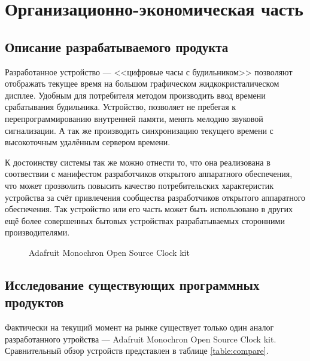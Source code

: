 \section{Организационно-экономическая часть}

\subsection{Описание разрабатываемого продукта}
\begin{par}
Разработанное устройство --- <<цифровые часы с будильником>> позволяют отображать
текущее время на большом графическом жидкокристалическом дисплее. Удобным для
потребителя методом производить ввод времени срабатывания будильника.
Устройство, позволяет не пребегая к перепрограммированию внутренней памяти, менять
мелодию звуковой сигнализации. А так же производить синхронизацию текущего времени
с высокоточным удалённым сервером времени.
\end{par}

\begin{par}
К достоинству системы так же можно отнести то, что она реализована в соотвествии с манифестом
разработчиков открытого аппаратного обеспечения, что может прозволить повысить качество потребительских
характеристик устройства за счёт привлечения сообщества разработчиков открытого аппаратного
обеспечения. Так устройство или его часть может быть использовано в других ещё более
совершенных бытовых устройствах разрабатываемых сторонними производителями.

\begin{figure}[h]
	\caption{Adafruit Monochron Open Source Clock kit}
	\label{img:adafruit}
\end{figure}

\end{par}

\subsection{Исследование существующих программных продуктов}
\begin{par}
Фактически на текущий момент на рынке существует только один аналог разработанного
утройства ---  Adafruit Monochron Open Source Clock kit.
Сравнительный обзор устройств представлен в таблице \ref{table:compare}.
\end{par}


